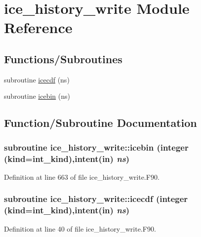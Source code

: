 \hypertarget{namespaceice__history__write}{
\section{ice\_\-history\_\-write Module Reference}
\label{namespaceice__history__write}
}
\subsection*{Functions/Subroutines}
\begin{DoxyCompactItemize}
\item 
subroutine \hyperlink{namespaceice__history__write_af99cb89d79e815ff4c40abdfacc34cf9}{icecdf} (ns)
\item 
subroutine \hyperlink{namespaceice__history__write_ab76a8fc642cb0db3916e0a9fb6a4d236}{icebin} (ns)
\end{DoxyCompactItemize}


\subsection{Function/Subroutine Documentation}
\hypertarget{namespaceice__history__write_ab76a8fc642cb0db3916e0a9fb6a4d236}{
\subsubsection[{icebin}]{\setlength{\rightskip}{0pt plus 5cm}subroutine ice\_\-history\_\-write::icebin (integer (kind=int\_\-kind),intent(in) {\em ns})}}
\label{namespaceice__history__write_ab76a8fc642cb0db3916e0a9fb6a4d236}


Definition at line 663 of file ice\_\-history\_\-write.F90.\hypertarget{namespaceice__history__write_af99cb89d79e815ff4c40abdfacc34cf9}{
\subsubsection[{icecdf}]{\setlength{\rightskip}{0pt plus 5cm}subroutine ice\_\-history\_\-write::icecdf (integer (kind=int\_\-kind),intent(in) {\em ns})}}
\label{namespaceice__history__write_af99cb89d79e815ff4c40abdfacc34cf9}


Definition at line 40 of file ice\_\-history\_\-write.F90.